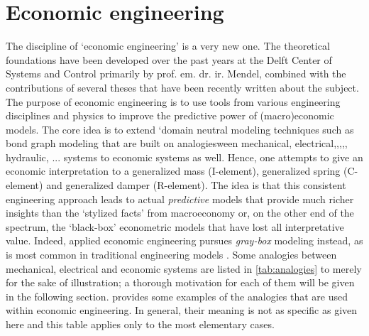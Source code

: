 \section{Economic engineering}
The discipline of `economic engineering' is a very new one. The theoretical foundations have been developed over the past years at the Delft Center of Systems and Control primarily by prof. em. dr. ir. Mendel, combined with the contributions of several theses that have been recently written about the subject. The purpose of economic engineering is to use tools from various engineering disciplines and physics to improve the predictive power of (macro)economic models. The core idea is to extend `domain neutral modeling techniques such as bond graph modeling \cite{Karnopp2012} that are built on analogiesween mechanical, electrical,,,,, hydraulic, ... systems to economic systems as well. Hence, one attempts to give an economic interpretation to a generalized mass (I-element), generalized spring (C-element) and generalized damper (R-element). The idea is that this consistent engineering approach leads to actual \emph{predictive} models that provide much richer insights than the `stylized facts' from macroeconomy or, on the other end of the spectrum, the `black-box' econometric models that have lost all interpretative value. Indeed, applied economic engineering pursues \emph{gray-box} modeling instead, as is most common in traditional engineering models \cite{Kruimer2021}. Some analogies between mechanical, electrical and economic systems are listed in \cref{tab:analogies} to merely for the sake of illustration; a thorough motivation for each of them will be given in the following section.  provides some examples of the analogies that are used within economic engineering. In general, their meaning is not as specific as given here and this table applies only to the most elementary cases. 
